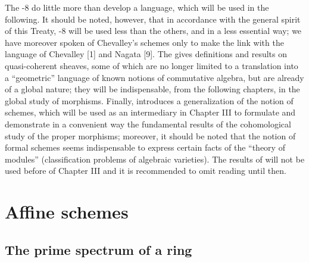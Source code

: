 \documentclass{book}
\begin{document}
The \textsection{}-8 do little more than develop a language, which will be used in the following.
It should be noted, however, that in accordance with the general spirit of this Treaty, \textsection{}-8 will be used less than the others, and in a less essential way; we have moreover spoken of Chevalley's schemes
only to make the link with the language of Chevalley [1] and Nagata [9]. The  gives definitions and results
on quasi-coherent sheaves, some of which are no longer limited to a translation into a ``geometric'' language of known notions
of commutative algebra, but are already of a global nature; they will be indispensable, from the following chapters,
in the global study of morphisms. Finally,  introduces a generalization of the notion of schemes, which will
be used as an intermediary in Chapter III to formulate and demonstrate in a convenient way the fundamental results of the
cohomological study of the proper morphisms; moreover, it should be noted that the notion of formal schemes seems indispensable
to express certain facts of the ``theory of modules'' (classification problems of algebraic varieties). The results of
 will not be used before  of Chapter III and it is recommended to omit reading until then.
\bigskip

\section{Affine schemes}
\label{1-schemes-1}

\subsection{The prime spectrum of a ring}
\label{1-schemes-1.1}
\end{document}

